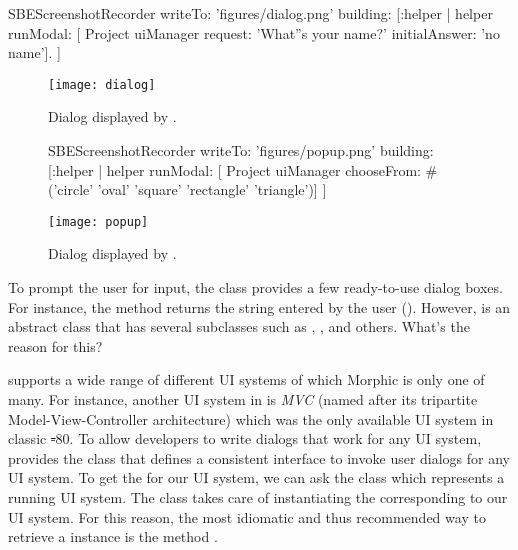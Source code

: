 \documentclass[a4paper,10pt,twoside]{book}
\begin{document}
\begin{ExecuteSmalltalkScript}
SBEScreenshotRecorder writeTo: 'figures/dialog.png' building: [:helper |
	helper runModal: [
		Project uiManager
			request: 'What''s your name?'
			initialAnswer: 'no name'].
]
\end{ExecuteSmalltalkScript}
\begin{figure}[htb]
\begin{minipage}[t]{0.363\textwidth}
	\centerline{\texttt{[image: dialog]}}
	\caption{Dialog displayed by .
		\label{fig:dialogName}}
\end{minipage}
\hfill
\begin{ExecuteSmalltalkScript}
SBEScreenshotRecorder writeTo: 'figures/popup.png' building: [:helper |
	helper runModal: [
		Project uiManager
			chooseFrom: #('circle' 'oval' 'square' 'rectangle' 'triangle')]
]
\end{ExecuteSmalltalkScript}
\begin{minipage}[t]{0.587\textwidth}
	\vfill
	\centerline{\texttt{[image: popup]}}
	\vfill
	\vspace{4ex}
	\caption{Dialog displayed by .
		\label{fig:dialogChoosing}}
\end{minipage}
\end{figure}

To prompt the user for input, the  class provides a few ready-to-use dialog boxes.
For instance, the  method returns the string entered by the user ().
However,  is an abstract class that has several subclasses such as , , and others.
What's the reason for this?

\sq supports a wide range of different UI systems of which Morphic is only one of many.
For instance, another UI system in \sq is \emph{MVC} (named after its tripartite Model-View-Controller architecture) which was the only available UI system in classic \st-80.
To allow developers to write dialogs that work for any UI system, \sq provides the  class that defines a consistent interface to invoke user dialogs for any UI system.
To get the  for our UI system, we can ask the class  which represents a running UI system.
The class  takes care of instantiating the  corresponding to our UI system.
For this reason, the most idiomatic and thus recommended way to retrieve a  instance is the method .
\end{document}
